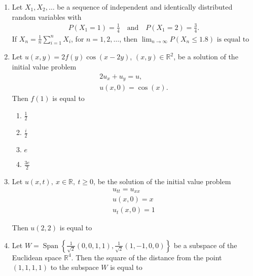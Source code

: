 \documentclass[journal]{IEEEtran}
\numberwithin{equation}{enumi}
\numberwithin{figure}{enumi}
\begin{document}
\begin{enumerate}
\item Let $X_1, X_2, \ldots$ be a sequence of independent and identically distributed random variables with
\begin{align*}
P(X_1 = 1) = \frac{1}{4} \quad \text{and} \quad P(X_1 = 2) = \frac{3}{4}.
\end{align*}
If $X_n = \frac{1}{n} \sum_{i=1}^{n} X_i$, for $n = 1, 2, \ldots$, then
$\lim_{n \to \infty} P(X_n \leq 1.8) \text{ is equal to }$ \underline{\hspace{2cm}}
\hfill{}

\item 
Let $u(x, y) = 2f(y)\cos(x - 2y)$, $(x, y) \in \mathbb{R}^2$, be a solution of the initial value problem
\begin{align*}
2u_x + u_y = u,\\
u(x, 0) = \cos(x).
\end{align*}
Then $f(1)$ is equal to
\hfill{}
\begin{multicols}{4}
\begin{enumerate}
   
    \item $\frac{1}{2}$
    \item $\frac{i}{2}$
    \item $e$
    \item $\frac{3e}{2}$
 
\end{enumerate}
\end{multicols}

\item Let $u(x, t),~x \in \mathbb{R},~t \geq 0$, be the solution of the initial value problem 
\begin{align*}
u_{tt} = u_{xx} \\
u(x, 0) = x\\
u_t(x, 0) = 1
\end{align*}

Then $u(2,2)$ is equal to \underline{\hspace{2cm}}
\hfill{}

\item Let $W = \operatorname{Span} \left\{ \frac{1}{\sqrt{2}} (0,0,1,1), \frac{1}{\sqrt{2}} (1,-1,0,0) \right\}$ be a subspace of the Euclidean space $\mathbb{R}^4$. Then the square of the distance from the point $(1,1,1,1)$ to the subspace $W$ is equal to \underline{\hspace{2cm}}
\hfill{}
\vspace{1em}


\end{enumerate}
\end{document}
